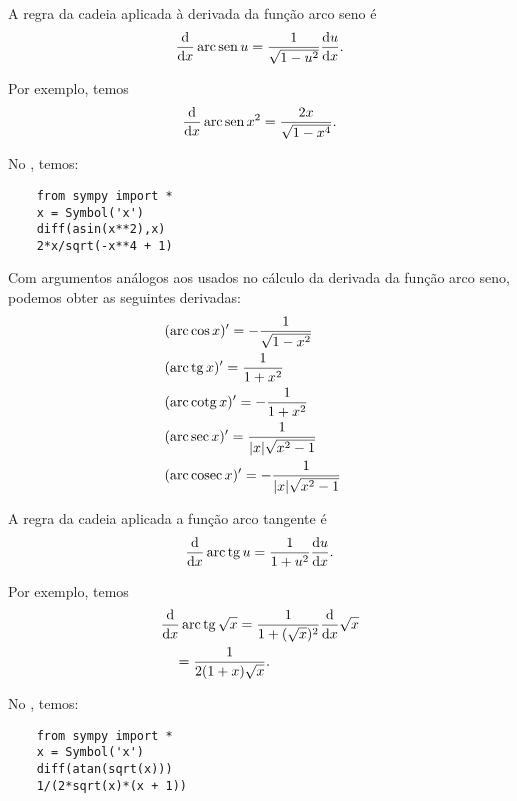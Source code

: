 \begin{ex}
  A regra da cadeia aplicada à derivada da função arco seno é
  \begin{equation}
    \frac{\mathrm{d}}{\mathrm{d} x}\operatorname{arc}\operatorname{sen} u = \frac{1}{\sqrt{1-u^2}}\frac{\mathrm{d} u}{\mathrm{d} x}.
  \end{equation}

  Por exemplo, temos
  \begin{equation}
    \frac{\mathrm{d}}{\mathrm{d} x}\operatorname{arc}\operatorname{sen} x^2 = \frac{2x}{\sqrt{1-x^4}}.
  \end{equation}

  \ifispython
  No \sympy, temos:
  \begin{lstlisting}
    from sympy import *
    x = Symbol('x')
    diff(asin(x**2),x)
    2*x/sqrt(-x**4 + 1)
  \end{lstlisting}
  \fi    
\end{ex}

Com argumentos análogos aos usados no cálculo da derivada da função arco seno, podemos obter as seguintes derivadas:
\begin{align}
  & (\operatorname{arc}\cos x)' = -\frac{1}{\sqrt{1-x^2}} & \\
  & (\operatorname{arc}\operatorname{tg} x)' = \frac{1}{1+x^2} \\
  & (\operatorname{arc}\operatorname{cotg} x)' = -\frac{1}{1+x^2} \\
  & (\operatorname{arc}\sec x)' = \frac{1}{|x|\sqrt{x^2-1}} \\
  & (\operatorname{arc}\operatorname{cosec} x)' = -\frac{1}{|x|\sqrt{x^2-1}}
\end{align}

\begin{ex}
  A regra da cadeia aplicada a função arco tangente é
  \begin{equation}
    \frac{\mathrm{d}}{\mathrm{d} x}\operatorname{arc}\operatorname{tg} u = \frac{1}{1+u^2}\frac{\mathrm{d} u}{\mathrm{d} x}.
  \end{equation}

  Por exemplo, temos
  \begin{align}
    & \frac{\mathrm{d}}{\mathrm{d} x}\operatorname{arc}\operatorname{tg}\sqrt{x} = \frac{1}{1+(\sqrt{x})^2}\frac{\mathrm{d}}{\mathrm{d} x}\sqrt{x} \\
    & \text{}\quad =  \frac{1}{2(1+x)\sqrt{x}}.
  \end{align}

  \ifispython
  No \sympy, temos:
  \begin{lstlisting}
    from sympy import *
    x = Symbol('x')
    diff(atan(sqrt(x)))
    1/(2*sqrt(x)*(x + 1))
  \end{lstlisting}
  \fi    
\end{ex}

